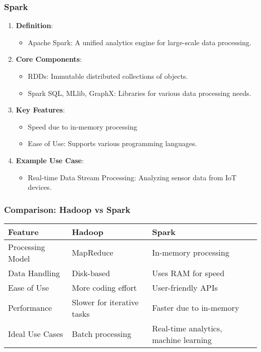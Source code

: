 \documentclass[aspectratio=169]{beamer}
\begin{document}
\begin{frame}[fragile]
    \frametitle{Spark}
    \begin{enumerate}
        \item \textbf{Definition}:
        \begin{itemize}
            \item Apache Spark: A unified analytics engine for large-scale data processing.
        \end{itemize}
        
        \item \textbf{Core Components}:
        \begin{itemize}
            \item RDDs: Immutable distributed collections of objects.
            \item Spark SQL, MLlib, GraphX: Libraries for various data processing needs.
        \end{itemize}
        
        \item \textbf{Key Features}:
        \begin{itemize}
            \item Speed due to in-memory processing
            \item Ease of Use: Supports various programming languages.
        \end{itemize}
        
        \item \textbf{Example Use Case}:
        \begin{itemize}
            \item Real-time Data Stream Processing: Analyzing sensor data from IoT devices.
        \end{itemize}
    \end{enumerate}
\end{frame}

\begin{frame}[fragile]
    \frametitle{Comparison: Hadoop vs Spark}
    \begin{tabular}{|l|l|l|}
        \hline
        \textbf{Feature} & \textbf{Hadoop} & \textbf{Spark} \\
        \hline
        Processing Model & MapReduce & In-memory processing \\
        \hline
        Data Handling & Disk-based & Uses RAM for speed \\
        \hline
        Ease of Use & More coding effort & User-friendly APIs \\
        \hline
        Performance & Slower for iterative tasks & Faster due to in-memory \\
        \hline
        Ideal Use Cases & Batch processing & Real-time analytics, machine learning \\
        \hline
    \end{tabular}
\end{frame}
\end{document}
